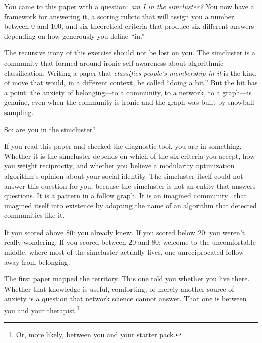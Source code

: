 \documentclass[11pt,a4paper]{article}
\begin{document}
You came to this paper with a question: \textit{am I in the simcluster?} You now have a framework for answering it, a scoring rubric that will assign you a number between 0 and 100, and six theoretical criteria that produce six different answers depending on how generously you define ``in.''

The recursive irony of this exercise should not be lost on you. The simcluster is a community that formed around ironic self-awareness about algorithmic classification. Writing a paper that \textit{classifies people's membership in it} is the kind of move that would, in a different context, be called ``doing a bit.'' But the bit has a point: the anxiety of belonging---to a community, to a network, to a graph---is genuine, even when the community is ironic and the graph was built by snowball sampling.

So: are you in the simcluster?

If you read this paper and checked the diagnostic tool, you are in something. Whether it is the simcluster depends on which of the six criteria you accept, how you weight reciprocity, and whether you believe a modularity optimization algorithm's opinion about your social identity. The simcluster itself could not answer this question for you, because the simcluster is not an entity that answers questions. It is a pattern in a follow graph. It is an imagined community~\cite{anderson1983} that imagined itself into existence by adopting the name of an algorithm that detected communities like it.

If you scored above 80: you already knew. If you scored below 20: you weren't really wondering. If you scored between 20 and 80: welcome to the uncomfortable middle, where most of the simcluster actually lives, one unreciprocated follow away from belonging.

The first paper mapped the territory. This one told you whether you live there. Whether that knowledge is useful, comforting, or merely another source of anxiety is a question that network science cannot answer. That one is between you and your therapist.\footnote{Or, more likely, between you and your starter pack.}
\end{document}
